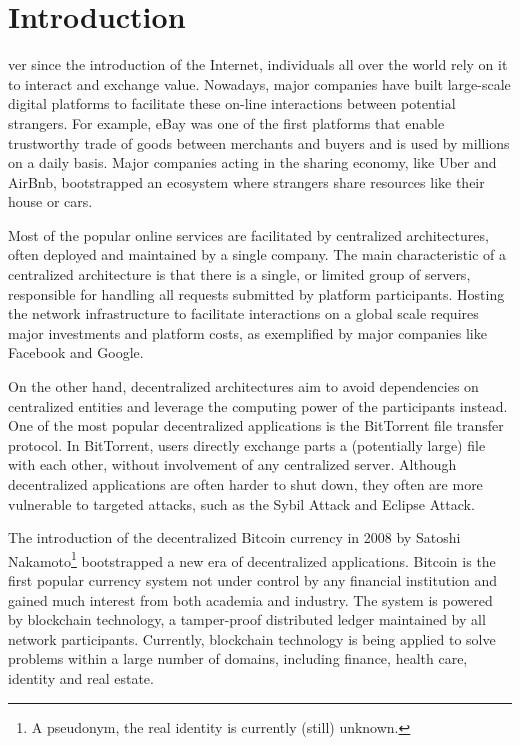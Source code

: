 \chapter{Introduction}
\label{introduction}


ver since the introduction of the Internet, individuals all over the world rely on it to interact and exchange value.
Nowadays, major companies have built large-scale digital platforms to facilitate these on-line interactions between potential strangers.
For example, eBay was one of the first platforms that enable trustworthy trade of goods between merchants and buyers and is used by millions on a daily basis.
Major companies acting in the sharing economy, like Uber and AirBnb, bootstrapped an ecosystem where strangers share resources like their house or cars.

Most of the popular online services are facilitated by centralized architectures, often deployed and maintained by a single company.
The main characteristic of a centralized architecture is that there is a single, or limited group of servers, responsible for handling all requests submitted by platform participants.
Hosting the network infrastructure to facilitate interactions on a global scale requires major investments and platform costs, as exemplified by major companies like Facebook and Google.

On the other hand, decentralized architectures aim to avoid dependencies on centralized entities and leverage the computing power of the participants instead.
One of the most popular decentralized applications is the BitTorrent file transfer protocol.
In BitTorrent, users directly exchange parts a (potentially large) file with each other, without involvement of any centralized server.
Although decentralized applications are often harder to shut down, they often are more vulnerable to targeted attacks, such as the Sybil Attack and Eclipse Attack.

The introduction of the decentralized Bitcoin currency in 2008 by Satoshi Nakamoto\footnote{A pseudonym, the real identity is currently (still) unknown.} bootstrapped a new era of decentralized applications.
Bitcoin is the first popular currency system not under control by any financial institution and gained much interest from both academia and industry.
The system is powered by blockchain technology, a tamper-proof distributed ledger maintained by all network participants.
Currently, blockchain technology is being applied to solve problems within a large number of domains, including finance, health care, identity and real estate.

